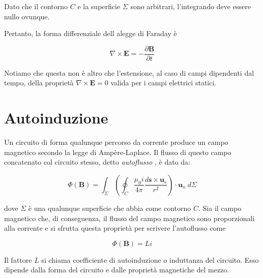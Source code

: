 Dato che il contorno $C$ e la superficie $\Sigma$ sono arbitrari, l'integrando deve essere nullo ovunque. \\

\newpage

Pertanto, la forma differenziale dell alegge di Faraday è 

\begin{tcolorbox}[colback=yellow!10!white, colframe=orange!70!black, boxrule=0.8pt]
\begin{equation} 
    \nabla \times \mathbf{E} = - \frac{\partial \mathbf{B}}{\partial t}
\end{equation}
\end{tcolorbox}

Notiamo che questa non è altro che l'estensione, al caso di campi dipendenti dal tempo, della proprietà $\nabla \times \mathbf{E} = 0$ valida per i campi elettrici statici. 

\section{Autoinduzione}

Un circuito di forma qualunque percorso da corrente produce un campo magnetico secondo la legge di Ampère-Laplace.
Il flusso di questo campo concatenato col circuito stesso, detto \emph{autoflusso} , è dato da:

\begin{equation*}
    \Phi(\mathbf{B}) = \int_{\Sigma} \left( \oint_{C} \frac{\mu_0 i}{4 \pi} \frac{d \mathbf{s} \times \mathbf{u}_r}{r^2} \right) \cdot \mathbf{u}_n \ d\Sigma
\end{equation*}

dove $\Sigma$ è una qualunque superficie che abbia come contorno $C$. Sia il campo magnetico che, di conseguenza, il flusso del campo magnetico sono proporzionali alla corrente e si sfrutta questa proprietà per scrivere l'autoflusso come

\begin{tcolorbox}[colback=yellow!10!white, colframe=orange!70!black, boxrule=0.8pt]
\begin{equation} 
    \Phi (\mathbf{B}) = L i 
\end{equation}
\end{tcolorbox}

Il fattore $L$ si chiama coefficiente di autoinduzione o induttanza  del circuito. Esso dipende dalla forma del circuito e dalle proprietà magnetiche del mezzo. 

